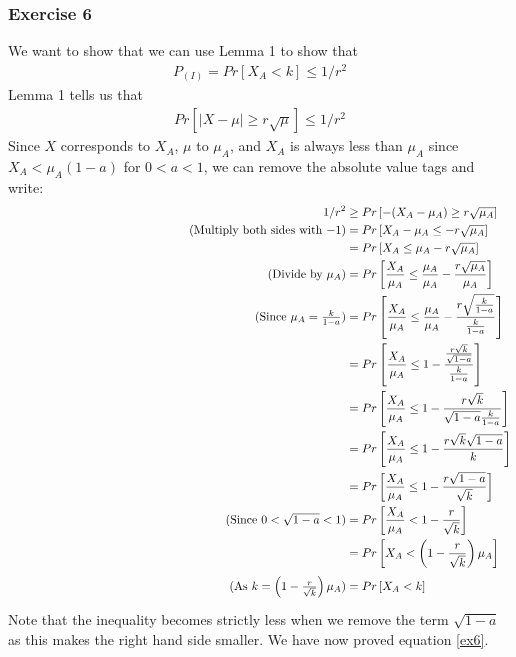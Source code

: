 \documentclass[a4paper]{article}
\newcommand\abs[1]{\left|#1\right|}
\newcommand{\comment}[1]{%
  \text{\phantom{(#1)}} \tag{#1}}
\begin{document}
\subsubsection*{Exercise 6}
We want to show that we can use Lemma 1 to show that
\begin{align}\label{ex6}
P_{(I)} = Pr\left[ X_A < k \right] \leq 1/r^2
\end{align}
Lemma 1 tells us that
\begin{align*}
Pr\left[ \abs{X-\mu} \geq r\sqrt{\mu} \right] \leq 1/r^2
\end{align*}
Since $X$ corresponds to $X_A$, $\mu$ to $\mu_A$, and $X_A$ is always less than $\mu_A$ since $X_A<\mu_A(1-a)$ for $0<a<1$, we can remove the absolute value tags and write:
\begin{align*}
1/r^2 &\geq Pr\left[ -(X_A-\mu_A) \geq r\sqrt{\mu_A} \right] \\
\comment{Multiply both sides with $-1$} &= Pr\left[ X_A-\mu_A\leq -r\sqrt{\mu_A} \right] \\
&= Pr\left[ X_A \leq \mu_A-r\sqrt{\mu_A} \right] \\
\comment{Divide by $\mu_A$} &= Pr\left[ \frac{X_A}{\mu_A} \leq \frac{\mu_A}{\mu_A}-\frac{r\sqrt{\mu_A}}{\mu_A} \right] \\
\comment{Since $\mu_A=\frac{k}{1-a}$} &= Pr\left[ \frac{X_A}{\mu_A} \leq \frac{\mu_A}{\mu_A}-\frac{r\sqrt{\frac{k}{1-a}}}{\frac{k}{1-a}} \right] \\
&= Pr\left[ \frac{X_A}{\mu_A} \leq 1-\frac{\frac{r\sqrt{k}}{\sqrt{1-a}}}{\frac{k}{1-a}} \right] \\
&= Pr\left[ \frac{X_A}{\mu_A} \leq 1-\frac{r\sqrt{k}}{\sqrt{1-a}\frac{k}{1-a}} \right] \\
&= Pr\left[ \frac{X_A}{\mu_A} \leq 1-\frac{r\sqrt{k}\sqrt{1-a}}{k} \right] \\
&= Pr\left[ \frac{X_A}{\mu_A} \leq 1-\frac{r\sqrt{1-a}}{\sqrt{k}} \right] \\
\comment{Since $0<\sqrt{1-a}<1$} &= Pr\left[ \frac{X_A}{\mu_A} < 1-\frac{r}{\sqrt{k}} \right] \\
&= Pr\left[ X_A < \left( 1-\frac{r}{\sqrt{k}} \right)\mu_A \right] \\
\comment{As $k=\left( 1-\frac{r}{\sqrt{k}} \right)\mu_A$} &= Pr\left[ X_A < k \right]
\end{align*}
Note that the inequality becomes strictly less when we remove the term $\sqrt{1-a}$ as this makes the right hand side smaller. We have now proved equation \ref{ex6}.
\end{document}
